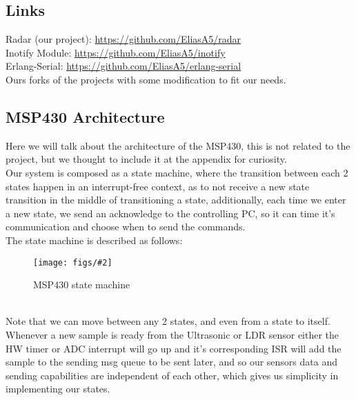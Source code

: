 \documentclass{article}
\newcommand{\myfig}[4]{
\begin{figure}[h]
    \centering
    \captionsetup{justification=centering}
    \texttt{[image: figs/\#2]}
    \caption{#3}
    \label{fig:#4}
\end{figure}
}
\begin{document}
\subsection{Links}
Radar (our project): \href{https://github.com/EliasA5/radar}{https://github.com/EliasA5/radar}\\
Inotify Module: \href{https://github.com/EliasA5/inotify}{https://github.com/EliasA5/inotify}\\
Erlang-Serial: \href{https://github.com/EliasA5/erlang-serial}{https://github.com/EliasA5/erlang-serial}\\
Ours forks of the projects with some modification to fit our needs.

\newpage
\subsection{MSP430 Architecture}
Here we will talk about the architecture of the MSP430, this is not related to the project, but we thought to include it at the appendix for curiosity.\\
Our system is composed as a state machine, where the transition between each 2 states happen in an interrupt-free context, as to not receive a new state transition in the middle of transitioning a state, additionally, each time we enter a new state, we send an acknowledge to the controlling PC, so it can time it's communication and choose when to send the commands.\\
The state machine is described as follows:
\myfig{0.9}{msp_statem.png}{MSP430 state machine}{mspstatem}\\
Note that we can move between any 2 states, and even from a state to itself.\\
Whenever a new sample is ready from the Ultrasonic or LDR sensor either the HW timer or ADC interrupt will go up and it's corresponding ISR will add the sample to the sending msg queue to be sent later, and so our sensors data and sending capabilities are independent of each other, which gives us simplicity in implementing our states.\\
 
\end{document}
